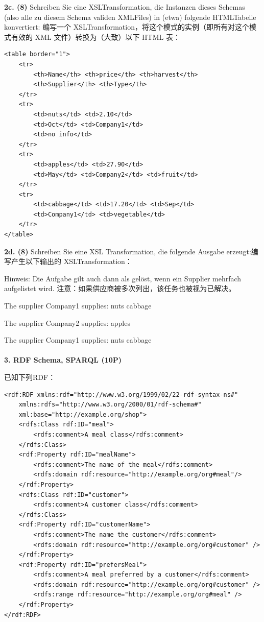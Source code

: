 \documentclass[fontset=windows]{article}
\begin{document}
\textbf{2c. (8) }Schreiben Sie eine XSL­Transformation, die Instanzen dieses Schemas (also alle zu diesem Schema validen XML­Files) in (etwa) folgende HTML­Tabelle konvertiert:
编写一个 XSLTransformation，将这个模式的实例（即所有对这个模式有效的 XML 文件）转换为（大致）以下 HTML 表：

\begin{verbatim}
<table border="1"> 
	<tr> 
		<th>Name</th> <th>price</th> <th>harvest</th> 
		<th>Supplier</th> <th>Type</th> 
	</tr> 
	<tr> 
		<td>nuts</td> <td>2.10</td> 
		<td>Oct</td> <td>Company1</td> 
		<td>no info</td> 
	</tr> 
	<tr> 
		<td>apples</td> <td>27.90</td> 
		<td>May</td> <td>Company2</td> <td>fruit</td> 
	</tr> 
	<tr> 
		<td>cabbage</td> <td>17.20</td> <td>Sep</td> 
		<td>Company1</td> <td>vegetable</td> 
	</tr> 
</table>
\end{verbatim}

\textbf{2d. (8) }Schreiben Sie eine XSL Transformation, die folgende Ausgabe erzeugt:编写产生以下输出的 XSLTransformation：

Hinweis: Die Aufgabe gilt auch dann als gelöst, wenn ein Supplier mehrfach aufgelistet wird.
注意：如果供应商被多次列出，该任务也被视为已解决。

\indent\indent The supplier Company1 supplies: nuts cabbage 

\indent\indent The supplier Company2 supplies: apples 

\indent\indent The supplier Company1 supplies: nuts cabbage
\\
\\
\textbf{3. RDF Schema, SPARQL (10P)}

已知下列RDF：

\begin{verbatim}
<rdf:RDF xmlns:rdf="http://www.w3.org/1999/02/22-rdf-syntax-ns#" 
	xmlns:rdfs="http://www.w3.org/2000/01/rdf-schema#" 
	xml:base="http://example.org/shop">
	<rdfs:Class rdf:ID="meal"> 
		<rdfs:comment>A meal class</rdfs:comment>
	</rdfs:Class>
	<rdf:Property rdf:ID="mealName"> 
		<rdfs:comment>The name of the meal</rdfs:comment> 
		<rdfs:domain rdf:resource="http://example.org/org#meal"/>
	</rdf:Property>
	<rdfs:Class rdf:ID="customer"> 
		<rdfs:comment>A customer class</rdfs:comment>
	</rdfs:Class>
	<rdf:Property rdf:ID="customerName"> 
		<rdfs:comment>The name the customer</rdfs:comment> 
		<rdfs:domain rdf:resource="http://example.org/org#customer" />
	</rdf:Property>
	<rdf:Property rdf:ID="prefersMeal"> 
		<rdfs:comment>A meal preferred by a customer</rdfs:comment> 
		<rdfs:domain rdf:resource="http://example.org/org#customer" /> 
		<rdfs:range rdf:resource="http://example.org/org#meal" />
	</rdf:Property> 
</rdf:RDF>
\end{verbatim}
\end{document}
